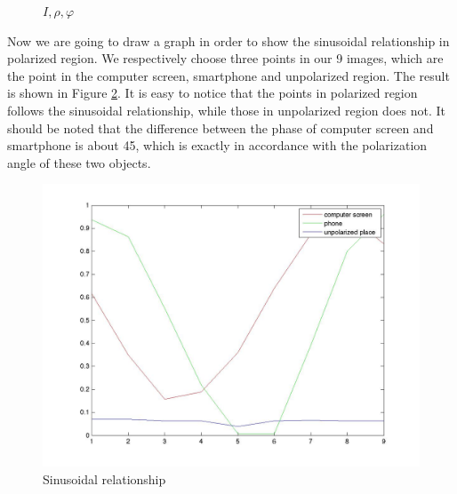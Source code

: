 \documentclass[english]{article}
\begin{document}
\begin{figure}[H]
	\centering
	\caption{$I, \rho, \varphi$}
	\label{fig:five}
\end{figure}

Now we are going to draw a graph in order to show the sinusoidal relationship in polarized region. We respectively choose three points in our 9 images, which are the point in the computer screen, smartphone and unpolarized region. The result is shown in Figure \ref{fig:plot}. It is easy to notice that the points in polarized region follows the sinusoidal relationship, while those in unpolarized region does not. It should be noted that the difference between the phase of computer screen and smartphone is about 45\textdegree, which is exactly in accordance with the polarization angle of these two objects.
 \begin{figure}[H]
 	\centering
	\includegraphics[width=\linewidth]{Pictures/Least_Mean/sin.jpg}
 	\caption{Sinusoidal relationship }
 	\label{fig:plot}
 \end{figure}
\end{document}
